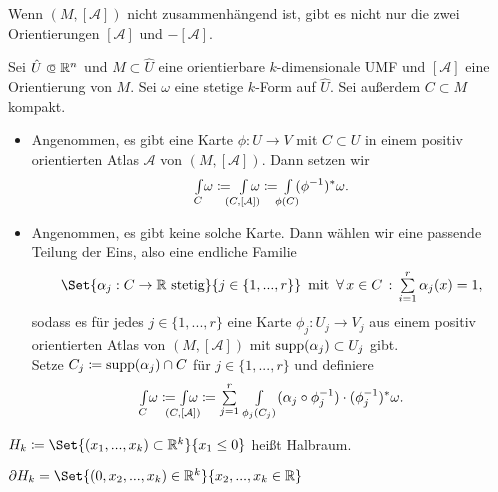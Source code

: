 \documentclass{cheat-sheet}
\newcommand{\Atlas}{\mathcal{A}} %
\theoremstyle{definition}
\newcommand{\Intdf}[2]{{\textstyle \int\limits_{#1}} #2} %
\begin{document}
\begin{bem}
  Wenn $(M, [\Atlas])$ nicht zusammenhängend ist, gibt es nicht nur die zwei Orientierungen $[\Atlas]$ und $-[\Atlas]$.
\end{bem}

\begin{defn}
  Sei $\hat{U} \opn \R^n$ und $M \subset \hat{U}$ eine orientierbare $k$-dimensionale UMF und $[\Atlas]$ eine Orientierung von $M$. Sei $\omega$ eine stetige $k$-Form auf $\hat{U}$. Sei außerdem $C \subset M$ kompakt.
  \begin{itemize}
    \item Angenommen, es gibt eine Karte $\phi : U \to V$ mit $C \subset U$ in einem positiv orientierten Atlas $\Atlas$ von $(M, [\Atlas])$. Dann setzen wir
    \[ \Intdf{C}{\omega} \coloneqq \,\, \Intdf{\mathclap{(C, [\Atlas])}}{\,\omega} \coloneqq \, \Intdf{\mathclap{\phi(C)}}{\, (\phi^{-1})^* \omega}. \]
    \item Angenommen, es gibt keine solche Karte. Dann wählen wir eine passende Teilung der Eins, also eine endliche Familie
    \[
      \Set{\alpha_j : C \to \R \text{ stetig}}{j \in \{ 1, ..., r \}}
      \enspace \text{mit} \enspace
      \fa{x \in C} \sum_{i=1}^r \alpha_j(x) = 1,
    \]
    sodass es für jedes $j \in \{ 1, ..., r \}$ eine Karte $\phi_j : U_j \to V_j$ aus einem positiv orientierten Atlas von $(M, [\Atlas])$ mit $\mathop{\mathrm{supp}}(\alpha_j) \subset U_j$ gibt.\\
    Setze $C_j \coloneqq \mathop{\mathrm{supp}}(\alpha_j) \cap C$ für $j \in \{ 1, ..., r \}$ und definiere
    \[
      \Intdf{C}{\omega} \coloneqq \Intdf{\mathclap{(C, [\Atlas])}}{\omega} \coloneqq \sum_{j=1}^r \Intdf{\,\phi_j(C_j)}{(\alpha_j \circ \phi_j^{-1}) \cdot (\phi_j^{-1})^* \omega}.
    \]
  \end{itemize}
\end{defn}



\begin{nota}
  $H_k \coloneqq \Set{ (x_1, ..., x_k) \subset \R^k }{ x_1 \leq 0 }$ heißt Halbraum.
\end{nota}

\begin{bem}
  $\partial H_k = \Set{ (0, x_2, ..., x_k) \in \R^k }{ x_2, ..., x_k \in \R }$
\end{bem}
\end{document}
